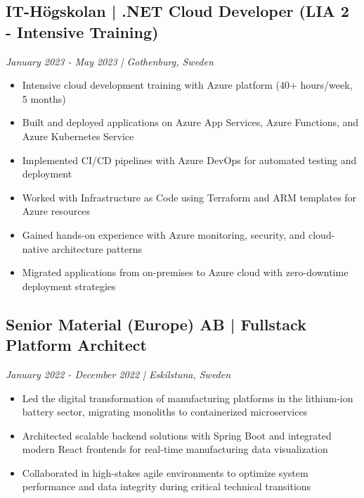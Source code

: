 \documentclass[11pt,a4paper]{article}
\begin{document}
\subsection*{IT-Högskolan | .NET Cloud Developer (LIA 2 - Intensive Training)}
\textit{January 2023 - May 2023 | Gothenburg, Sweden}
\begin{itemize}[noitemsep]
\item Intensive cloud development training with Azure platform (40+ hours/week, 5 months)
\item Built and deployed applications on Azure App Services, Azure Functions, and Azure Kubernetes Service
\item Implemented CI/CD pipelines with Azure DevOps for automated testing and deployment
\item Worked with Infrastructure as Code using Terraform and ARM templates for Azure resources
\item Gained hands-on experience with Azure monitoring, security, and cloud-native architecture patterns
\item Migrated applications from on-premises to Azure cloud with zero-downtime deployment strategies
\end{itemize}

\subsection*{Senior Material (Europe) AB | Fullstack Platform Architect}
\textit{January 2022 - December 2022 | Eskilstuna, Sweden}
\begin{itemize}[noitemsep]
\item Led the digital transformation of manufacturing platforms in the lithium-ion battery sector, migrating monoliths to containerized microservices
\item Architected scalable backend solutions with Spring Boot and integrated modern React frontends for real-time manufacturing data visualization
\item Collaborated in high-stakes agile environments to optimize system performance and data integrity during critical technical transitions
\end{itemize}
\end{document}
